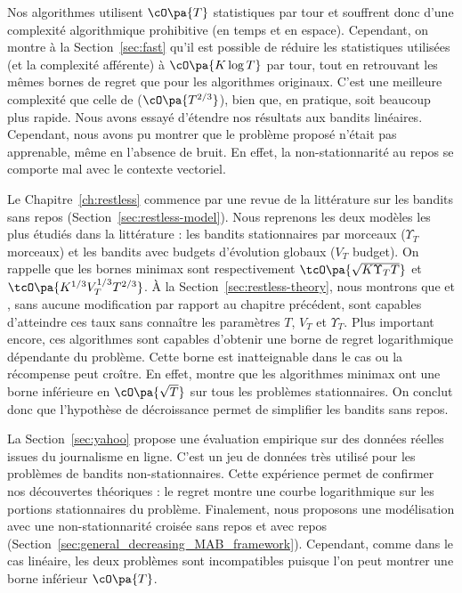 Nos algorithmes utilisent $\cO\pa{T}$ statistiques par tour et souffrent donc d'une complexité algorithmique prohibitive (en temps et en espace). Cependant, on montre à la Section~\ref{sec:fast} qu'il est possible de réduire les statistiques utilisées (et la complexité afférente) à $\cO\pa{K\log{T}}$ par tour, tout en retrouvant les mêmes bornes de regret que pour les algorithmes originaux. C'est une meilleure complexité que celle de \SWA ($\cO\pa{T^{2/3}}$), bien que, en pratique, \SWA soit beaucoup plus rapide. Nous avons essayé d'étendre nos résultats aux bandits linéaires. Cependant, nous avons pu montrer que le problème proposé n'était pas apprenable, même en l'absence de bruit. En effet, la non-stationnarité au repos se comporte mal avec le contexte vectoriel.


Le Chapitre~\ref{ch:restless} commence par une revue de la littérature sur les bandits sans repos (Section~\ref{sec:restless-model}). Nous reprenons les deux modèles les plus étudiés dans la littérature : les bandits stationnaires par morceaux ($\Upsilon_T$ morceaux) et les bandits avec budgets d'évolution globaux ($V_T$ budget). On rappelle que les bornes minimax sont respectivement $\tcO\pa{\sqrt{K\Upsilon_T T}}$ et $\tcO\pa{K^{1/3}V_T^{1/3} T^{2/3}}$. À la Section~\ref{sec:restless-theory}, nous montrons que \FEWA et \RAWUCB, sans aucune modification par rapport au chapitre précédent, sont capables d'atteindre ces taux sans connaître les paramètres $T$, $V_T$ et $\Upsilon_T$. Plus important encore, ces algorithmes sont capables d'obtenir une borne de regret logarithmique dépendante du problème. Cette borne est inatteignable dans le cas ou la récompense peut croître. En effet, \citet{garivier2011upper-confidence-bound} montre que les algorithmes minimax ont une borne inférieure en $\cO\pa{\sqrt{T}}$ sur tous les problèmes stationnaires. On conclut donc que l'hypothèse de décroissance permet de simplifier les bandits sans repos.

La Section~\ref{sec:yahoo} propose une évaluation empirique sur des données réelles issues du journalisme en ligne. C'est un jeu de données très utilisé pour les problèmes de bandits non-stationnaires. Cette expérience permet de confirmer nos découvertes théoriques : le regret montre une courbe logarithmique sur les portions stationnaires du problème. Finalement, nous proposons une modélisation avec une non-stationnarité croisée sans repos et avec repos (Section~\ref{sec:general_decreasing_MAB_framework}). Cependant, comme dans le cas linéaire, les deux problèmes sont incompatibles puisque l'on peut montrer une borne inférieur $\cO\pa{T}$.

